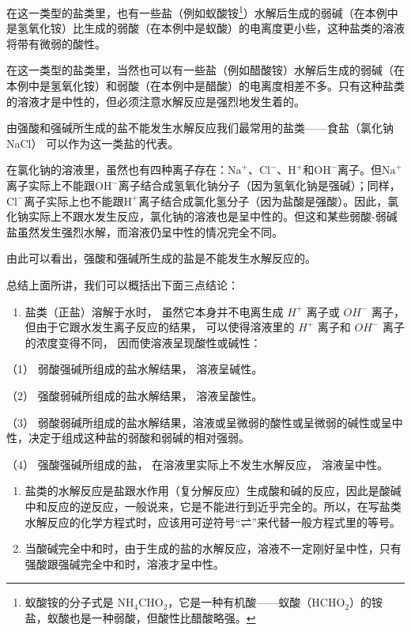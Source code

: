 在这一类型的盐类里，也有一些盐（例如蚁酸铵\footnote{蚁酸铵的分子式是
  \(\mathrm{NH_4CHO_2}\)，它是一种有机酸------蚁酸（\(\mathrm{HCHO_2}\)）的铵盐，蚁酸也是一种弱酸，但酸性比醋酸略强。}）水解后生成的弱碱（在本例中是氢氧化铵）比生成的弱酸（在本例中是蚁酸）的电离度更小些，这种盐类的溶液将带有微弱的酸性。

在这一类型的盐类里，当然也可以有一些盐（例如醋酸铵）水解后生成的弱碱（在本例中是氢氧化铵）和弱酸（在本例中是醋酸）的电离度相差不多。只有这种盐类的溶液才是中性的，但必须注意水解反应是强烈地发生着的。

由强酸和强碱所生成的盐不能发生水解反应我们最常用的盐类------食盐（氯化钠
NaCl） 可以作为这一类盐的代表。

在氯化钠的溶液里，虽然也有四种离子存在：\(\mathrm{Na}^{+}\)、\(\mathrm{Cl}^{-}\)、\(\mathrm{H}^{+}\)和\(\mathrm{OH}^{-}\)离子。但\(\mathrm{Na}^{+}\)离子实际上不能跟\(\mathrm{OH}^{-}\)离子结合成氢氧化钠分子（因为氢氧化钠是强碱）；同样，\(\mathrm{Cl}^{-}\)离子实际上也不能跟\(\mathrm{H}^{+}\)离子结合成氯化氢分子（因为盐酸是强酸）。因此，氯化钠实际上不跟水发生反应，氯化钠的溶液也是呈中性的。但这和某些弱酸-弱碱盐虽然发生强烈水解，而溶液仍呈中性的情况完全不同。

由此可以看出，强酸和强碱所生成的盐是不能发生水解反应的。

总结上面所讲，我们可以概括出下面三点结论：

\begin{enumerate}
\item
  盐类（正盐）溶解于水时， 虽然它本身并不电离生成 \(H^{+}\) 离子或
  \(OH^{-}\) 离子， 但由于它跟水发生离子反应的结果， 可以使得溶液里的
  \(H^{+}\) 离子和 \(OH^{-}\) 离子的浓度变得不同，
  因而使溶液呈现酸性或碱性：
\end{enumerate}

（1） 弱酸强碱所组成的盐水解结果， 溶液呈碱性。

（2） 强酸弱碱所组成的盐水解结果， 溶液呈酸性。

（3）
弱酸弱碱所组成的盐水解结果，溶液或呈微弱的酸性或呈微弱的碱性或呈中性，决定于组成这种盐的弱酸和弱碱的相对强弱。

（4） 强酸强碱所组成的盐， 在溶液里实际上不发生水解反应， 溶液呈中性。

\begin{enumerate}[start=2]
\item
  盐类的水解反应是盐跟水作用（复分解反应）生成酸和碱的反应，因此是酸碱中和反应的逆反应，一般说来，它是不能进行到近乎完全的。所以，在写盐类水解反应的化学方程式时，应该用可逆符号``⇌''来代替一般方程式里的等号。
\item
  当酸碱完全中和时，由于生成的盐的水解反应，溶液不一定刚好呈中性，只有强酸跟强碱完全中和时，溶液才呈中性。
\end{enumerate}

